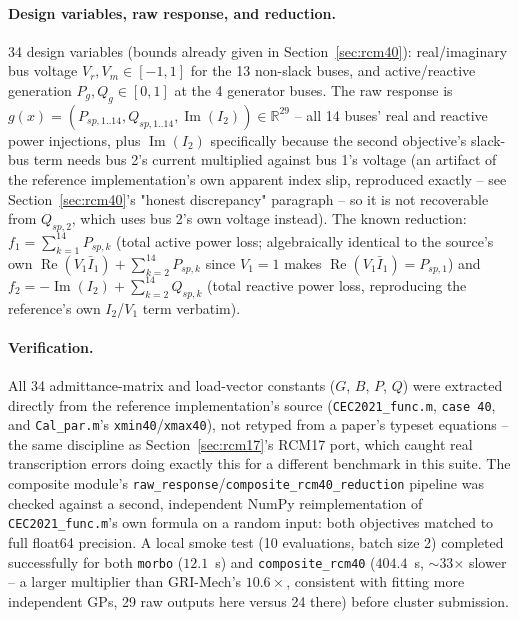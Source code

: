 \documentclass[11pt]{article}
\begin{document}
\paragraph{Design variables, raw response, and reduction.} 34
design variables (bounds already given in Section~\ref{sec:rcm40}):
real/imaginary bus
voltage $V_r, V_m \in [-1,1]$ for the 13 non-slack buses, and
active/reactive generation $P_g, Q_g \in [0,1]$ at the 4 generator
buses. The raw response is $g(x) = (P_{sp,1..14}, Q_{sp,1..14},
\operatorname{Im}(I_2)) \in \mathbb{R}^{29}$ -- all 14 buses' real and
reactive power injections, plus $\operatorname{Im}(I_2)$ specifically
because the second objective's slack-bus term needs bus 2's current
multiplied against bus 1's voltage (an artifact of the reference
implementation's own apparent index slip, reproduced exactly -- see
Section~\ref{sec:rcm40}'s "honest discrepancy" paragraph -- so it is not
recoverable from $Q_{sp,2}$, which uses bus 2's own voltage instead).
The known reduction: $f_1 = \sum_{k=1}^{14} P_{sp,k}$ (total active
power loss; algebraically identical to the source's own
$\operatorname{Re}(V_1\bar I_1) + \sum_{k=2}^{14} P_{sp,k}$ since
$V_1=1$ makes $\operatorname{Re}(V_1 \bar I_1) = P_{sp,1}$) and
$f_2 = -\operatorname{Im}(I_2) + \sum_{k=2}^{14} Q_{sp,k}$ (total
reactive power loss, reproducing the reference's own $I_2$/$V_1$
term verbatim).

\paragraph{Verification.} All 34 admittance-matrix and load-vector
constants ($G$, $B$, $P$, $Q$) were extracted directly from the
reference implementation's source
(\texttt{CEC2021\_func.m}, \texttt{case 40}, and \texttt{Cal\_par.m}'s
\texttt{xmin40}/\texttt{xmax40}), not retyped from a paper's typeset
equations -- the same discipline as Section~\ref{sec:rcm17}'s RCM17
port, which caught real transcription errors doing exactly this for a
different benchmark in this suite. The composite module's
\texttt{raw\_response}/\texttt{composite\_rcm40\_reduction} pipeline was
checked against a second, independent NumPy reimplementation of
\texttt{CEC2021\_func.m}'s own formula on a random input: both
objectives matched to full float64 precision. A local smoke test (10
evaluations, batch size 2) completed successfully for both
\texttt{morbo} ($12.1$~s) and \texttt{composite\_rcm40} ($404.4$~s,
$\sim$33$\times$ slower -- a larger multiplier than GRI-Mech's
$10.6\times$, consistent with fitting more independent GPs, 29 raw
outputs here versus 24 there) before cluster submission.
\end{document}
